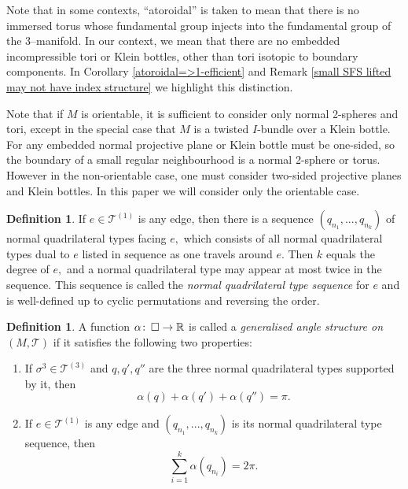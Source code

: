 \documentclass[12pt]{amsart}
\theoremstyle{definition}
\newtheorem{defn}[thm]{Definition}
\theoremstyle{remark}
\newcommand{\co}{\colon\thinspace}
\def\tri{\mathcal{T}}
\begin{document}
Note that in some contexts, ``atoroidal'' is taken to mean that there is no immersed torus whose fundamental group injects into the fundamental group of the 3--manifold. In our context, we mean that there are no embedded incompressible tori or Klein bottles, other than tori isotopic to boundary components. In Corollary \ref{atoroidal=>1-efficient} and Remark \ref{small SFS lifted may not have index structure} we highlight this distinction.  

Note that if $M$ is orientable, it is sufficient to consider only normal 2-spheres and tori, except in the special case that $M$ is a twisted $I$-bundle over a Klein bottle. For any embedded normal projective plane or Klein bottle must be one-sided, so the boundary of a small regular neighbourhood is a normal 2-sphere or torus. However in the non-orientable case, one must consider two-sided projective planes and Klein bottles. In this paper we will consider only the orientable case. 

\begin{defn}
If $e\in \tri^{(1)}$ is any edge, then there is a sequence $(q_{n_1}, ..., q_{n_k})$ of normal quadrilateral types facing $e,$ which consists of all normal quadrilateral types dual to $e$ listed in sequence as one travels around $e.$ Then $k$ equals the degree of $e,$ and a normal quadrilateral type may appear at most twice in the sequence. This sequence is called the \emph{normal quadrilateral type sequence} for $e$ and is well-defined up to cyclic permutations and reversing the order. 
\end{defn}

\begin{defn}\label{angle structures}
A function $\alpha\co \square \to \mathbb{R}$ is called a \emph{generalised angle structure on $(M,\tri)$} if it satisfies the following two properties:
\begin{enumerate}
\item If $\sigma^3 \in \tri^{(3)}$ and $q, q', q''$ are the three normal quadrilateral types supported by it, then
\begin{equation*}
   \alpha(q) + \alpha(q') + \alpha(q'') =\pi.
\end{equation*}
\item If $e\in \tri^{(1)}$ is any edge and $(q_{n_1}, ..., q_{n_k})$ is its normal quadrilateral type sequence, then
\begin{equation*}
\sum_{i=1}^k \alpha(q_{n_i})  =2\pi.
\end{equation*}
\end{enumerate}
\end{defn}
\end{document}
